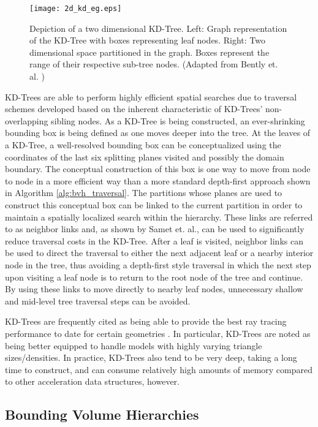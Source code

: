 \begin{figure}[H]
  \centering
  \texttt{[image: 2d\_kd\_eg.eps]}
  \caption[A 2D KD-Tree example.]{Depiction of a two dimensional KD-Tree. Left: Graph representation of
    the KD-Tree with boxes representing leaf nodes. Right: Two dimensional space
    partitioned in the graph. Boxes represent the range of their respective
    sub-tree nodes. (Adapted from Bently et. al. \cite{Bentley_1975})}
  \label{fig:2D_kd_tree}
\end{figure}

KD-Trees are able to perform highly efficient spatial searches due to traversal
schemes developed based on the inherent characteristic of KD-Trees'
non-overlapping sibling nodes. As a KD-Tree is being constructed, an
ever-shrinking bounding box is being defined as one moves deeper into the
tree. At the leaves of a KD-Tree, a well-resolved bounding box can be
conceptualized using the coordinates of the last six splitting planes visited
and possibly the domain boundary. The conceptual construction of this box is one
way to move from node to node in a more efficient way than a more standard
depth-first approach shown in Algorithm \ref{alg:bvh_traversal}. The partitions
whose planes are used to construct this conceptual box can be linked to the
current partition in order to maintain a spatially localized search within the
hierarchy. These links are referred to as neighbor links and, as shown by Samet
et. al.\cite{Samet_1989}, can be used to significantly reduce traversal costs in
the KD-Tree. After a leaf is visited, neighbor links can be used to direct the
traversal to either the next adjacent leaf or a nearby interior node in the
tree, thus avoiding a depth-first style traversal in which the next step upon
visiting a leaf node is to return to the root node of the tree and continue. By
using these links to move directly to nearby leaf nodes, unnecessary shallow and
mid-level tree traversal steps can be avoided.

KD-Trees are frequently cited as being able to provide the best ray tracing
performance to date for certain geometries
\cite{Ernst_2007,Hurley_2002,Havran_2000}. In particular, KD-Trees are noted as
being better equipped to handle models with highly varying triangle
sizes/densities. In practice, KD-Trees also tend to be very deep, taking a long
time to construct, and can consume relatively high amounts of memory compared to
other acceleration data structures, however.

\subsection{Bounding Volume Hierarchies}%
\label{subsec:BVH}

